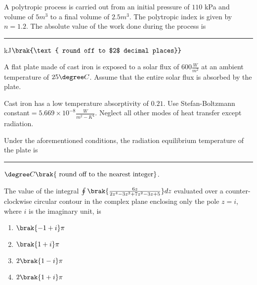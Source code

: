 \item{
A polytropic process is carried out from an initial pressure of $110$ kPa and volume of $5m^3$ to a final volume of $2.5m^3$. The polytropic index is given by $n=1.2$. The absolute value of the work done during the process is \rule{2cm}{0.15mm}kJ$\brak{\text{ round off to $2$ decimal places}}$\\
}
\item{
A flat plate made of cast iron is exposed to a solar flux of $600\frac{W}{m^2}$ at an ambient temperature of $25\degree C$. Assume that the entire solar flux is absorbed by the plate.

Cast iron has a low temperature absorptivity of $0.21$. Use Stefan-Boltzmann constant$=5.669\times 10^{-8}\frac{W}{m^2-K^4}$. Neglect all other modes of heat transfer except radiation.

Under the aforementioned conditions, the radiation equilibrium temperature of the plate is \rule{2cm}{0.15mm}$\degree C\brak{\text{ round off to the nearest integer}}$.\\
}
\item{
The value of the integral $\oint\brak{\frac{6z}{2z^4-3z^3+7z^2-3z+5}}dz$ evaluated over a counter-clockwise circular contour in the complex plane enclosing only the pole $z=i$, where $i$ is the imaginary unit, is
\begin{multicols}{4}
\begin{enumerate}
\item $\brak{-1+i}\pi$
\item $\brak{1+i}\pi$
\item $2\brak{1-i}\pi$ 
\item $2\brak{1+i}\pi$
\end{enumerate}
\end{multicols}
}
